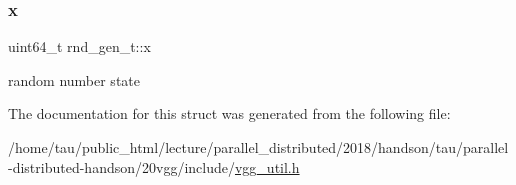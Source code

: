 \subsubsection{\texorpdfstring{x}{x}}
{\footnotesize\ttfamily uint64\+\_\+t rnd\+\_\+gen\+\_\+t\+::x}

random number state 

The documentation for this struct was generated from the following file\+:\begin{DoxyCompactItemize}
\item 
/home/tau/public\+\_\+html/lecture/parallel\+\_\+distributed/2018/handson/tau/parallel-\/distributed-\/handson/20vgg/include/\hyperlink{vgg__util_8h}{vgg\+\_\+util.\+h}\end{DoxyCompactItemize}
